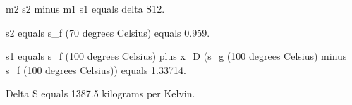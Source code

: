 m2 s2 minus m1 s1 equals delta S12.  

s2 equals s_f (70 degrees Celsius) equals 0.959.  

s1 equals s_f (100 degrees Celsius) plus x_D (s_g (100 degrees Celsius) minus s_f (100 degrees Celsius)) equals 1.33714.  

Delta S equals 1387.5 kilograms per Kelvin.